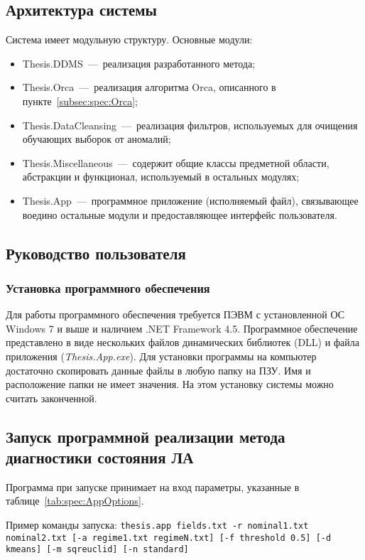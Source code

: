 \subsection{Архитектура системы}
Система имеет модульную структуру.
Основные модули:
\begin{itemize}
	\item Thesis.DDMS~---~реализация разработанного метода;
	\item Thesis.Orca~---~реализация алгоритма Orca, описанного в пункте~\ref{subsec:spec:Orca};
	\item Thesis.DataCleansing~---~реализация фильтров, используемых для очищения обучающих выборок от аномалий;
	\item Thesis.Miscellaneous~---~содержит общие классы предметной области, абстракции и функционал, используемый в остальных модулях;
	\item Thesis.App~---~программное приложение (исполняемый файл), связывающее воедино остальные модули и предоставляющее интерфейс пользователя.
\end{itemize}

\subsection{Руководство пользователя}
\subsubsection{Установка программного обеспечения}
Для работы программного обеспечения требуется ПЭВМ с установленной ОС Windows 7 и выше и наличием .NET Framework 4.5. Программное обеспечение представлено в виде нескольких файлов динамических библиотек (DLL) и файла приложения (\textit{Thesis.App.exe}). Для установки программы на компьютер достаточно скопировать данные файлы в любую папку на ПЗУ. Имя и расположение папки не имеет значения. На этом установку системы можно считать законченной.

\subsection{Запуск программной реализации метода диагностики состояния ЛА}
Программа при запуске принимает на вход параметры, указанные в таблице~\ref{tab:spec:AppOptions}.

Пример команды запуска: \texttt{thesis.app fields.txt -r nominal1.txt nominal2.txt [-a regime1.txt regimeN.txt] [-f threshold 0.5] [-d kmeans] [-m sqreuclid] [-n standard]}

